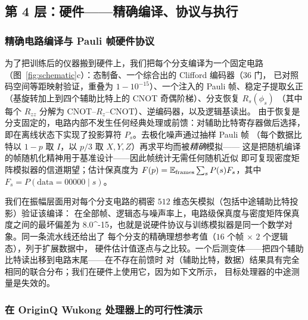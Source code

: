 \documentclass[11pt,a4paper]{article}
\begin{document}
\subsection*{第 4 层：硬件——精确编译、协议与执行}

\subsubsection*{精确电路编译与 Pauli 帧硬件协议}

为了把训练后的仪器搬到硬件上，我们把每个分支编译为一个固定电路
（图~\ref{fig:schematic}c）：态制备、一个综合出的 Clifford 编码器（$36$ 门，
已对照码空间等距映射验证，重叠为 $1-10^{-15}$）、一个注入的 Pauli 帧、稳定子提取幺正
（基旋转加上到四个辅助比特上的 CNOT 奇偶阶梯）、分支恢复 $R_s(\phi_s)$
（其中每个 $R_{zz}$ 分解为 CNOT--$R_z$--CNOT）、逆编码器，以及逻辑基读出。
由于恢复是分支固定的，电路内部不发生任何经典处理或前馈：对辅助比特寄存器做后选择，
即在离线状态下实现了投影算符 $P_s$。去极化噪声通过抽样 Pauli 帧
（每个数据比特以 $1-p$ 取 $I$，以 $p/3$ 取 $X,Y,Z$）再求平均而被\emph{精确}模拟——
这是把随机编译~\cite{wallman_rc} 的帧随机化精神用于基准设计——因此帧统计无需任何随机近似
即可复现密度矩阵模拟器的信道期望；估计保真度为
$F(p)=\mathbb{E}_{\rm frames}\sum_s P(s)F_s$，其中
$F_s=P(\text{data}=00000\mid s)$。

我们在振幅层面用对每个分支电路的稠密 $512$ 维态矢模拟（包括中途辅助比特投影）验证该编译：
在全部帧、逻辑态与噪声率上，电路级保真度与密度矩阵保真度之间的最坏偏差为
8.0^{-15}，也就是说硬件协议与训练模拟器是同一个数学对象。同一条流水线还给出了
每个分支的精确理想参考值（$16$ 个帧 $\times$ $2$ 个逻辑态），列于扩展数据中，
硬件估计值逐点与之比较。一个后测变体——把四个辅助比特读出移到电路末尾——在不存在前馈时
对（辅助比特，数据）结果具有完全相同的联合分布；我们在硬件上使用它，因为如下文所示，
目标处理器的中途测量是失效的。

\subsubsection*{在 OriginQ Wukong 处理器上的可行性演示}
\end{document}
